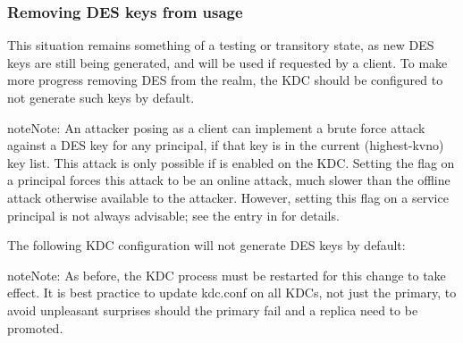 \documentclass[letterpaper,10pt,english]{sphinxmanual}
\begin{document}
\subsubsection{Removing DES keys from usage}
\label{\detokenize{admin/advanced/retiring-des:removing-des-keys-from-usage}}
This situation remains something of a testing or transitory state,
as new DES keys are still being generated, and will be used if requested
by a client.  To make more progress removing DES from the realm, the KDC
should be configured to not generate such keys by default.

\begin{sphinxadmonition}{note}{Note:}
An attacker posing as a client can implement a brute force attack against
a DES key for any principal, if that key is in the current (highest-kvno)
key list.  This attack is only possible if 
is enabled on the KDC.  Setting the  flag on a
principal forces this attack to be an online attack, much slower than
the offline attack otherwise available to the attacker.  However, setting
this flag on a service principal is not always advisable; see the entry in
{\hyperref[\detokenize{admin/admin_commands/kadmin_local:add-principal}]{}} for details.
\end{sphinxadmonition}

The following KDC configuration will not generate DES keys by default:

%
\begin{sphinxVerbatim}[commandchars=\\\{\}]
\PYG{p}{[}\PYG{p}{]}
          
                     
\end{sphinxVerbatim}

\begin{sphinxadmonition}{note}{Note:}
As before, the KDC process must be restarted for this change to take
effect.  It is best practice to update kdc.conf on all KDCs, not just the
primary, to avoid unpleasant surprises should the primary fail and a
replica need to be promoted.
\end{sphinxadmonition}
\end{document}
